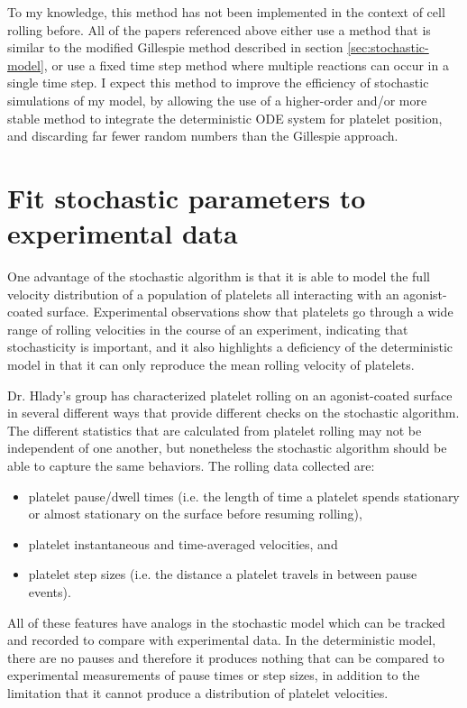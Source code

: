 To my knowledge, this method has not been implemented in the context
of cell rolling before. All of the papers referenced above either use
a method that is similar to the modified Gillespie method described in
section \ref{sec:stochastic-model}, or use a fixed time step method
where multiple reactions can occur in a single time step. I expect
this method to improve the efficiency of stochastic simulations of my
model, by allowing the use of a higher-order and/or more stable method
to integrate the deterministic ODE system for platelet position, and
discarding far fewer random numbers than the Gillespie approach.

\section{Fit stochastic parameters to experimental data}
\label{sec:fit-stoch-param}

One advantage of the stochastic algorithm is that it is able to
model the full velocity distribution of a population of platelets all
interacting with an agonist-coated surface. Experimental observations
show that platelets go through a wide range of rolling velocities in
the course of an experiment, indicating that stochasticity is
important, and it also highlights a deficiency of the deterministic
model in that it can only reproduce the mean rolling velocity of
platelets.

Dr. Hlady's group has characterized platelet rolling on an
agonist-coated surface in several different ways that provide
different checks on the stochastic algorithm. The different statistics
that are calculated from platelet rolling may not be independent
of one another, but nonetheless the stochastic algorithm should be
able to capture the same behaviors. The rolling data collected are:
\begin{itemize}
\item platelet pause/dwell times (i.e. the length of time a platelet
  spends stationary or almost stationary on the surface before
  resuming rolling),
\item platelet instantaneous and time-averaged velocities, and
\item platelet step sizes (i.e. the distance a platelet travels in
  between pause events).
\end{itemize}

All of these features have analogs in the stochastic model which can
be tracked and recorded to compare with experimental data. In the
deterministic model, there are no pauses and therefore it produces
nothing that can be compared to experimental measurements of pause
times or step sizes, in addition to the limitation that it cannot
produce a distribution of platelet velocities.

